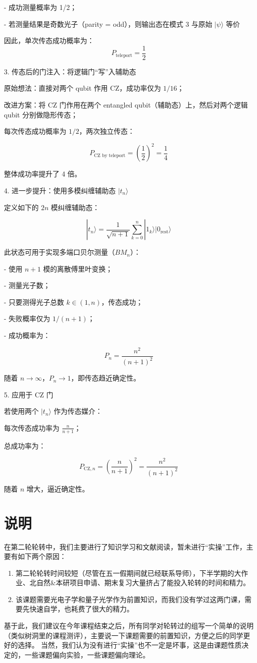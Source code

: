 \documentclass[hyperref, fntef, fancyhdr,zihao = -4,UTF8]{ctexart}
\begin{document}
- 成功测量概率为 1/2；

- 若测量结果是奇数光子（parity = odd），则输出态在模式 3 与原始 $|\psi\rangle$ 等价

因此，单次传态成功概率为：
\[
P_{\text{teleport}} = \frac{1}{2}
\]


 3. 传态后的门注入：将逻辑门“写”入辅助态

原始想法：直接对两个 qubit 作用 CZ，成功率仅为 $1/16$；

改进方案：将 CZ 门作用在两个 entangled qubit（辅助态）上，然后对两个逻辑 qubit 分别做隐形传态；


每次传态成功概率为 $1/2$，两次独立传态：

\[
P_{\text{CZ by teleport}} = \left( \frac{1}{2} \right)^2 = \frac{1}{4}
\]

整体成功率提升了 4 倍。

 4. 进一步提升：使用多模纠缠辅助态 $|t_n\rangle$

定义如下的 $2n$ 模纠缠辅助态：

\[
|t_n\rangle = \frac{1}{\sqrt{n+1}} \sum_{k=0}^{n} |1_k\rangle |0_{\text{rest}}\rangle
\]

此状态可用于实现多端口贝尔测量（$BM_n$）：

- 使用 $n+1$ 模的离散傅里叶变换；

- 测量光子数；

- 只要测得光子总数 $k \in (1, n)$，传态成功；

- 失败概率仅为 $1/(n+1)$；

- 成功概率为：

\[
P_n = \frac{n^2}{(n+1)^2}
\]

随着 $n \rightarrow \infty$，$P_n \rightarrow 1$，即传态趋近确定性。


 5. 应用于 CZ 门

若使用两个 $|t_n\rangle$ 作为传态媒介：

每次传态成功率为 $\frac{n}{n+1}$；

总成功率为：

\[
P_{\text{CZ}, n} = \left( \frac{n}{n+1} \right)^2 = \frac{n^2}{(n+1)^2}
\]

随着 $n$ 增大，逼近确定性。

\section{说明}

在第二轮轮转中，我们主要进行了知识学习和文献阅读，暂未进行“实操”工作，主要有如下两个原因：
\begin{enumerate}
    \item 第二轮轮转时间较短（尽管在五一假期间就已经联系导师），下半学期的大作业、北自然\&本研项目申请、期末复习大量挤占了能投入轮转的时间和精力。
    \item 该课题需要光电子学和量子光学作为前置知识，而我们没有学过这两门课，需要先快速自学，也耗费了很大的精力。
\end{enumerate}

基于此，我们建议在今年课程结束之后，所有同学对轮转过的组写一个简单的说明（类似树洞里的课程测评），主要说一下课题需要的前置知识，方便之后的同学更好的选择。
当然，我们认为没有进行“实操”也不一定是坏事，这是由课题性质决定的，一些课题偏向实验，一些课题偏向理论。

\newpage



\end{document}
